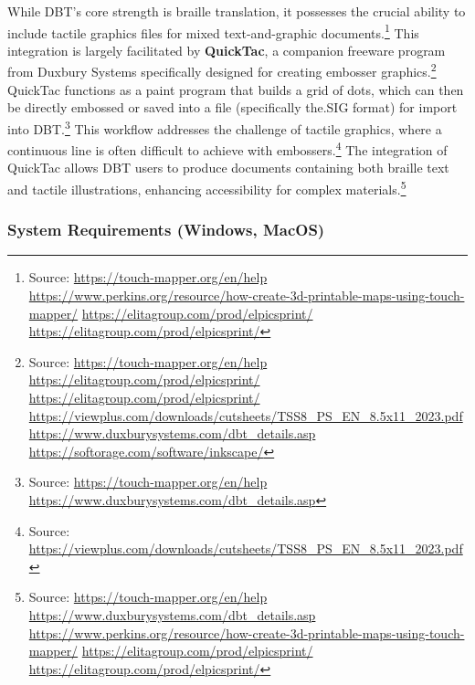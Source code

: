 While DBT's core strength is braille translation, it possesses the crucial ability to include tactile graphics files for mixed text-and-graphic documents.\footnote{Source:  \url{https://touch-mapper.org/en/help} \url{https://www.perkins.org/resource/how-create-3d-printable-maps-using-touch-mapper/} \url{https://elitagroup.com/prod/elpicsprint/} \url{https://elitagroup.com/prod/elpicsprint/}} This integration is largely facilitated by \textbf{QuickTac}, a companion freeware program from Duxbury Systems specifically designed for creating embosser graphics.\footnote{Source:  \url{https://touch-mapper.org/en/help} \url{https://elitagroup.com/prod/elpicsprint/} \url{https://elitagroup.com/prod/elpicsprint/} \url{https://viewplus.com/downloads/cutsheets/TSS8_PS_EN_8.5x11_2023.pdf} \url{https://www.duxburysystems.com/dbt_details.asp} \url{https://softorage.com/software/inkscape/}} QuickTac functions as a paint program that builds a grid of dots, which can then be directly embossed or saved into a file (specifically the.SIG format) for import into DBT.\footnote{Source:  \url{https://touch-mapper.org/en/help} \url{https://www.duxburysystems.com/dbt_details.asp}} This workflow addresses the challenge of tactile graphics, where a continuous line is often difficult to achieve with embossers.\footnote{Source:  \url{https://viewplus.com/downloads/cutsheets/TSS8_PS_EN_8.5x11_2023.pdf}} The integration of QuickTac allows DBT users to produce documents containing both braille text and tactile illustrations, enhancing accessibility for complex materials.\footnote{Source:  \url{https://touch-mapper.org/en/help} \url{https://www.duxburysystems.com/dbt_details.asp} \url{https://www.perkins.org/resource/how-create-3d-printable-maps-using-touch-mapper/} \url{https://elitagroup.com/prod/elpicsprint/} \url{https://elitagroup.com/prod/elpicsprint/}}

\subsubsection{System Requirements (Windows, MacOS)}

